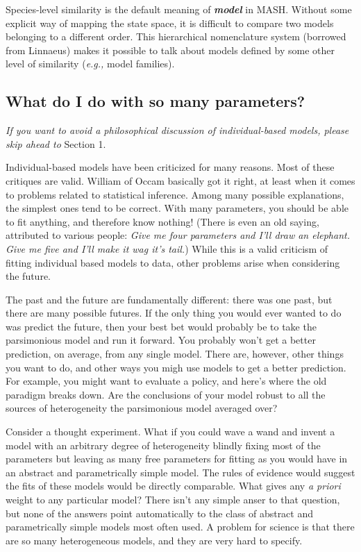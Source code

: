 \documentclass{article}
\newcommand{\eg}{{\em e.g., }}
\begin{document}
%
Species-level similarity is the default meaning of {\em \bf model} in MASH. Without some explicit way of mapping the state space, it is difficult to compare two models belonging to a different order. This hierarchical nomenclature system (borrowed from Linnaeus) makes it possible to talk about models defined by some other level of similarity (\eg model families).

\clearpage 

\subsection{What do I do with so many parameters?} 

\begin{displayquote}
{\em If you want to avoid a philosophical discussion of individual-based models, please skip ahead to} Section 1.
\end{displayquote}

Individual-based models have been criticized for many reasons. Most of these critiques are valid. William of Occam basically got it right, at least when it comes to problems related to statistical inference. Among many possible explanations, the simplest ones tend to be correct. With many parameters, you should be able to fit anything, and therefore know nothing! (There is even an old saying, attributed to various people: {\em Give me four parameters and I'll draw an elephant. Give me five and I'll make it wag it's tail.})  While this is a valid criticism of fitting individual based models to data, other problems arise when considering the future.

The past and the future are fundamentally different: there was one past, but there are many possible futures.  If the only thing you would ever wanted to do was predict the future, then your best bet would probably be to take the parsimonious model and run it forward. You probably won't get a better prediction, on average, from any single model. There are, however, other things you want to do, and other ways you migh use models to get a better prediction. For example, you might want to evaluate a policy, and here's where the old paradigm breaks down. Are the conclusions of your model robust to all the sources of heterogeneity the parsimonious model averaged over?

Consider a thought experiment. What if you could wave a wand and invent a model with an arbitrary degree of heterogeneity blindly fixing most of the parameters but leaving as many free parameters for fitting as you would have in an abstract and parametrically simple model. The rules of evidence would suggest the fits of these  models would be directly comparable. What gives any {\em a priori} weight to any particular model? There isn't any simple anser to that question, but none of the answers point automatically to the class of abstract and parametrically simple models most often used. A problem for science is that there are so many heterogeneous models, and they are very hard to specify. 
\end{document}
